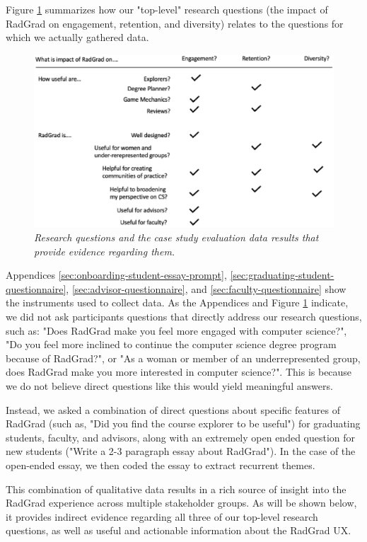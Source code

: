 \documentclass[acmsmall]{acmart}
\begin{document}
Figure \ref{fig:eval-questions} summarizes how our "top-level" research questions (the impact of RadGrad on engagement, retention, and diversity) relates to the questions for which we actually gathered data.

\begin{figure}[t]
\centering
\includegraphics[width=\linewidth]{images/research-questions.eps}
\caption{\em Research questions and the case study evaluation data results that provide evidence regarding them. }
\label{fig:eval-questions}
\end{figure}

Appendices \ref{sec:onboarding-student-essay-prompt}, \ref{sec:graduating-student-questionnaire}, \ref{sec:advisor-questionnaire}, and \ref{sec:faculty-questionnaire} show the instruments used to collect data. As the Appendices and Figure \ref{fig:eval-questions} indicate, we did not ask participants questions that directly address our research questions, such as: "Does RadGrad make you feel more engaged with computer science?", "Do you feel more inclined to continue the computer science degree program because of RadGrad?", or "As a woman or member of an underrepresented group, does RadGrad make you more interested in computer science?".  This is because we do not believe direct questions like this would yield meaningful answers.

Instead, we asked a combination of direct questions about specific features of RadGrad (such as, "Did you find the course explorer to be useful") for graduating students, faculty, and advisors, along with an extremely open ended question for new students ("Write a 2-3 paragraph essay about RadGrad").  In the case of the open-ended essay, we then coded the essay to extract recurrent themes.

This combination of qualitative data results in a rich source of insight into the RadGrad experience across multiple stakeholder groups. As will be shown below, it provides indirect evidence regarding all three of our top-level research questions, as well as useful and actionable information about the RadGrad UX.
\end{document}
